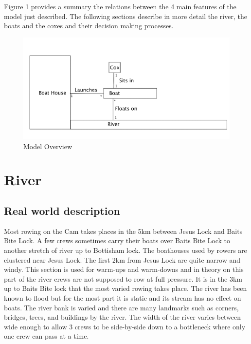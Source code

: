     Figure \ref{fig:modeloverview} provides a summary the relations between the 4 main features of the model just described. The following sections describe in more detail the river, the boats and the coxes and their decision making processes.
    
    \begin{figure}
    \begin{center}
    	\includegraphics[scale=0.3]{images/ModelOverview.png}
    	\caption{Model Overview}
    	\label{fig:modeloverview}
    \end{center}
    \end{figure}

    \section{River}
      \subsection{Real world description}
      Most rowing on the Cam takes places in the 5km between Jesus Lock and Baits Bite Lock. A few crews sometimes carry their boats over Baits Bite Lock to another stretch of river up to Bottisham lock. The boathouses used by rowers are clustered near Jesus Lock. The first 2km from Jesus Lock are quite narrow and windy. This section is used for warm-ups and warm-downs and in theory on this part of the river crews are not supposed to row at full pressure. It is in the 3km up to Baits Bite lock that the most varied rowing takes place. The river has been known to flood but for the most part it is static and its stream has no effect on boats. The river bank is varied and there are many landmarks such as corners, bridges, trees, and buildings by the river. The width of the river varies between wide enough to allow 3 crews to be side-by-side down to a bottleneck where only one crew can pass at a time.
      
